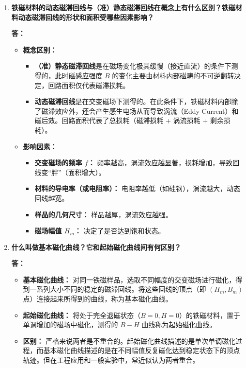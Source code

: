 \documentclass[11pt]{article}
\begin{document}
\begin{enumerate}
    \item \textbf{铁磁材料的动态磁滞回线与（准）静态磁滞回线在概念上有什么区别？铁磁材料动态磁滞回线的形状和面积受哪些因素影响？}
    
    \textbf{答：}
    \begin{itemize}
        \item \textbf{概念区别：} 
        \begin{itemize}
            \item \textbf{（准）静态磁滞回线}是在磁场变化极其缓慢（接近直流）的条件下测得的，此时磁感应强度 $B$ 的变化主要由材料内部磁畴的不可逆翻转决定，回路面积仅代表磁滞损耗。
            \item \textbf{动态磁滞回线}是在交变磁场下测得的。在此条件下，铁磁材料内部除了磁滞效应外，还会产生感生电场从而导致涡流（Eddy Current）和磁后效。回路面积代表了总损耗（磁滞损耗 + 涡流损耗 + 剩余损耗）。
        \end{itemize}
        \item \textbf{影响因素：} 
        \begin{itemize}
            \item \textbf{交变磁场的频率 $f$：} 频率越高，涡流效应越显著，损耗增加，导致回线变“胖”（面积增大）。
            \item \textbf{材料的导电率（或电阻率）：} 电阻率越低（如硅钢），涡流越大，动态回线越宽。
            \item \textbf{样品的几何尺寸：} 样品越厚，涡流效应越强。
            \item \textbf{磁场幅值 $H_m$：} 决定了是否达到饱和状态。
        \end{itemize}
    \end{itemize}

    \item \textbf{什么叫做基本磁化曲线？它和起始磁化曲线间有何区别？}
    
    \textbf{答：}
    \begin{itemize}
        \item \textbf{基本磁化曲线：} 对同一铁磁样品，选取不同幅度的交变磁场进行磁化，得到一系列大小不同的稳定的磁滞回线。将这些回线的顶点（即 $(H_m, B_m)$ 点）连接起来所得到的曲线，称为基本磁化曲线。
        \item \textbf{起始磁化曲线：} 将处于完全退磁状态（$B=0, H=0$）的铁磁材料，置于单调增加的磁场中磁化，测得的 $B-H$ 曲线称为起始磁化曲线。
        \item \textbf{区别：} 严格来说两者是不重合的。起始磁化曲线描述的是单次单调磁化过程，而基本磁化曲线描述的是在不同幅值反复磁化达到稳定状态下的顶点轨迹。但在工程应用和一般实验中，常近似认为两者重合。
    \end{itemize}


\end{enumerate}
\end{document}
